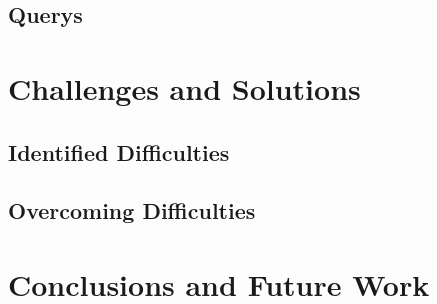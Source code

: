 \documentclass[fleqn,11pt]{article}
\begin{document}

\subsection{Querys}

\section{Challenges and Solutions}

\subsection{Identified Difficulties}



\subsection{Overcoming Difficulties}



\section{Conclusions and Future Work}
\end{document}
